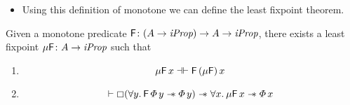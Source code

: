 \documentclass[thesis.tex]{subfiles}
\begin{document}
\begin{itemize}
    \item Using this definition of monotone we can define the least fixpoint theorem.
\end{itemize}

\begin{theorem}
    \label{thm:leastfixpoint}
    Given a monotone predicate $\textsf{\upshape F}\colon (A \to \textit{iProp}) \to  A \to \textit{iProp}$, there exists a least fixpoint $\mu\textsf{\upshape F}\colon  A \to \textit{iProp}$ such that
    \begin{enumerate}
        \item \[ \mu\textsf{\upshape F}\, x \mathrel{\dashv\vdash} \textsf{\upshape F}\, (\mu\textsf{\upshape F})\, x \]
        \item \[ \proves \always (\All \varB. \hopred\, \pred\, \varB \wand \pred\, \varB) \wand \All \var. \lfp\hopred\, \var \wand \pred\, \var \]
    \end{enumerate}
\end{theorem}
\end{document}
